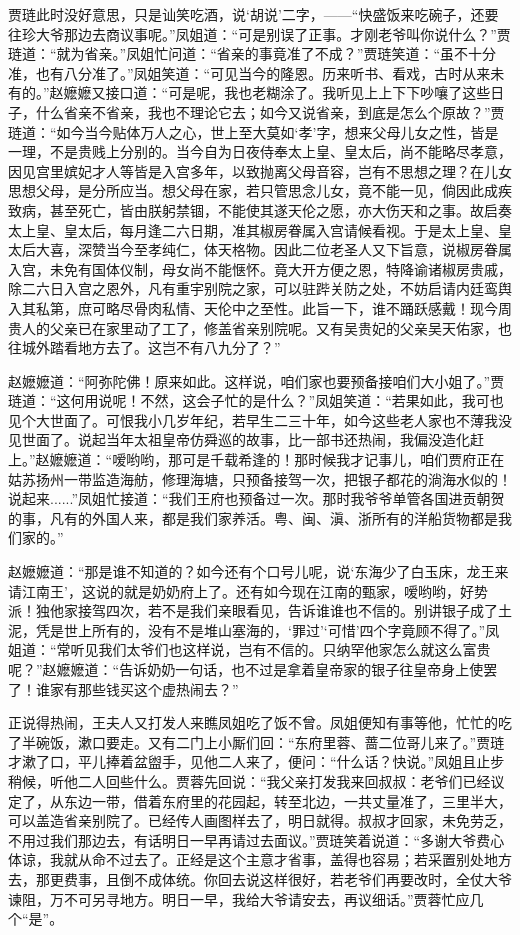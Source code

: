 \documentclass[12pt,oneside]{book}
\begin{document}
贾琏此时没好意思，只是讪笑吃酒，说‘胡说’二字，——“快盛饭来吃碗子，还要往珍大爷那边去商议事呢。”凤姐道：“可是别误了正事。才刚老爷叫你说什么？”贾琏道：“就为省亲。”凤姐忙问道：“省亲的事竟准了不成？”贾琏笑道：“虽不十分准，也有八分准了。”凤姐笑道：“可见当今的隆恩。历来听书、看戏，古时从来未有的。”赵嬷嬷又接口道：“可是呢，我也老糊涂了。我听见上上下下吵嚷了这些日子，什么省亲不省亲，我也不理论它去；如今又说省亲，到底是怎么个原故？”贾琏道：“如今当今贴体万人之心，世上至大莫如‘孝’字，想来父母儿女之性，皆是一理，不是贵贱上分别的。当今自为日夜侍奉太上皇、皇太后，尚不能略尽孝意，因见宫里嫔妃才人等皆是入宫多年，以致抛离父母音容，岂有不思想之理？在儿女思想父母，是分所应当。想父母在家，若只管思念儿女，竟不能一见，倘因此成疾致病，甚至死亡，皆由朕躬禁锢，不能使其遂天伦之愿，亦大伤天和之事。故启奏太上皇、皇太后，每月逢二六日期，准其椒房眷属入宫请候看视。于是太上皇、皇太后大喜，深赞当今至孝纯仁，体天格物。因此二位老圣人又下旨意，说椒房眷属入宫，未免有国体仪制，母女尚不能惬怀。竟大开方便之恩，特降谕诸椒房贵戚，除二六日入宫之恩外，凡有重宇别院之家，可以驻跸关防之处，不妨启请内廷鸾舆入其私第，庶可略尽骨肉私情、天伦中之至性。此旨一下，谁不踊跃感戴！现今周贵人的父亲已在家里动了工了，修盖省亲别院呢。又有吴贵妃的父亲吴天佑家，也往城外踏看地方去了。这岂不有八九分了？”

赵嬷嬷道：“阿弥陀佛！原来如此。这样说，咱们家也要预备接咱们大小姐了。”贾琏道：“这何用说呢！不然，这会子忙的是什么？”凤姐笑道：“若果如此，我可也见个大世面了。可恨我小几岁年纪，若早生二三十年，如今这些老人家也不薄我没见世面了。说起当年太祖皇帝仿舜巡的故事，比一部书还热闹，我偏没造化赶上。”赵嬷嬷道：“嗳哟哟，那可是千载希逢的！那时候我才记事儿，咱们贾府正在姑苏扬州一带监造海舫，修理海塘，只预备接驾一次，把银子都花的淌海水似的！说起来......”凤姐忙接道：“我们王府也预备过一次。那时我爷爷单管各国进贡朝贺的事，凡有的外国人来，都是我们家养活。粤、闽、滇、浙所有的洋船货物都是我们家的。”

赵嬷嬷道：“那是谁不知道的？如今还有个口号儿呢，说‘东海少了白玉床，龙王来请江南王’，这说的就是奶奶府上了。还有如今现在江南的甄家，嗳哟哟，好势派！独他家接驾四次，若不是我们亲眼看见，告诉谁谁也不信的。别讲银子成了土泥，凭是世上所有的，没有不是堆山塞海的，‘罪过’‘可惜’四个字竟顾不得了。”凤姐道：“常听见我们太爷们也这样说，岂有不信的。只纳罕他家怎么就这么富贵呢？”赵嬷嬷道：“告诉奶奶一句话，也不过是拿着皇帝家的银子往皇帝身上使罢了！谁家有那些钱买这个虚热闹去？”

正说得热闹，王夫人又打发人来瞧凤姐吃了饭不曾。凤姐便知有事等他，忙忙的吃了半碗饭，漱口要走。又有二门上小厮们回：“东府里蓉、蔷二位哥儿来了。”贾琏才漱了口，平儿捧着盆盥手，见他二人来了，便问：“什么话？快说。”凤姐且止步稍候，听他二人回些什么。贾蓉先回说：“我父亲打发我来回叔叔：老爷们已经议定了，从东边一带，借着东府里的花园起，转至北边，一共丈量准了，三里半大，可以盖造省亲别院了。已经传人画图样去了，明日就得。叔叔才回家，未免劳乏，不用过我们那边去，有话明日一早再请过去面议。”贾琏笑着说道：“多谢大爷费心体谅，我就从命不过去了。正经是这个主意才省事，盖得也容易；若采置别处地方去，那更费事，且倒不成体统。你回去说这样很好，若老爷们再要改时，全仗大爷谏阻，万不可另寻地方。明日一早，我给大爷请安去，再议细话。”贾蓉忙应几个“是”。
\end{document}
